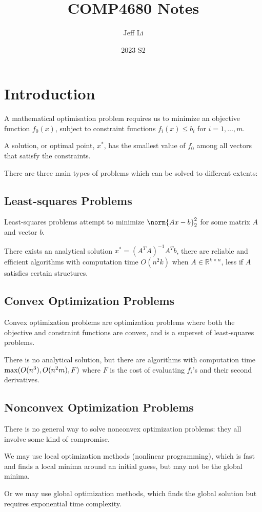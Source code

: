 \documentclass[11pt]{article}
\title{COMP4680 Notes}
\author{Jeff Li}
\date{2023 S2}
\begin{document}
\maketitle

\setcounter{section}{-1}
\section{Introduction} 
A mathematical optimisation problem requires us to minimize an objective function $f_0(x)$, subject to constraint functions $f_i(x) \leq b_i$ for $i = 1, \ldots, m$. \par
A solution, or optimal point, $x^*$, has the smallest value of $f_0$ among all vectors that satisfy the constraints. \par 
There are three main types of problems which can be solved to different extents: 
\subsection{Least-squares Problems} 
Least-squares problems attempt to minimize $\norm{Ax - b}_2^2$ for some matrix $A$ and vector $b$. \par
There exists an analytical solution $x^* = (A^TA)^{-1}A^Tb$, there are reliable and efficient algorithms with computation time $O(n^2k)$ when $A \in \mathbb{R}^{k\times n}$, less if $A$ satisfies certain structures. 
\subsection{Convex Optimization Problems} 
Convex optimization problems are optimization problems where both the objective and constraint functions are convex, and is a superset of least-squares problems. \par 
There is no analytical solution, but there are algorithms with computation time $\mathrm{max}(O(n^3), \\O(n^2m), F)$ where $F$ is the cost of evaluating $f_i$'s and their second derivatives. 
\subsection{Nonconvex Optimization Problems} 
There is no general way to solve nonconvex optimization problems: they all involve some kind of compromise. \par
We may use local optimization methods (nonlinear programming), which is fast and finds a local minima around an initial guess, but may not be the global minima. \par
Or we may use global optimization methods, which finds the global solution but requires exponential time complexity. 
\end{document}
